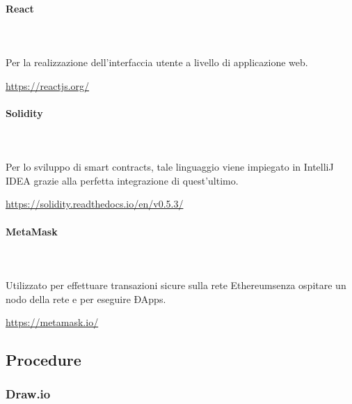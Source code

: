\paragraph{React} \mbox{}\\ \mbox{}\\ 
Per la realizzazione dell'interfaccia utente a livello di applicazione web.\newline
\centerline{\url{https://reactjs.org/}}

\paragraph{Solidity} \mbox{}\\ \mbox{}\\ 
Per lo sviluppo di smart contracts\glo, tale linguaggio viene impiegato in IntelliJ IDEA grazie alla perfetta integrazione di quest'ultimo.\newline
\centerline{\url{https://solidity.readthedocs.io/en/v0.5.3/}}

\paragraph{MetaMask} \mbox{}\\ \mbox{}\\ 
Utilizzato per effettuare transazioni sicure sulla rete Ethereum\glosp senza ospitare un nodo della rete e per eseguire ÐApps\glo. \newline
\centerline{\url{https://metamask.io/}}

\subsection{Procedure}
\subsubsection{Draw.io} 
